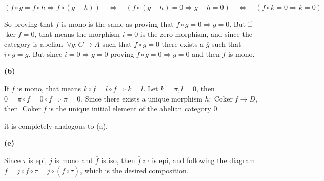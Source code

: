 \documentclass[leqno]{article}
\DeclareMathOperator{\coker}{Coker}
\begin{document}
\fbox{$\Leftarrow$}
\[
  (f\circ g = f\circ h \Rightarrow f\circ (g-h) ) \quad \iff \quad (f\circ (g-h)=0 \Rightarrow g-h=0 ) \quad \iff \quad (f\circ k =0 \Rightarrow k=0)
\] 

So proving that $f$ is mono is the same as proving that $f\circ g = 0 \Rightarrow g=0$. But if $\ker f = 0$, that means the morphism  $i=0$ is the zero morphism, and since the category is abelian  $\ \forall g:C\to A$ such that $f\circ g=0$ there exists a $\overline{g}$ such that $i\circ \overline{g}=g$. But since $i=0 \Rightarrow g=0$ proving $f\circ g =0 \Rightarrow g=0$ and then $f$ is mono.


\textbf{(b)}

\fbox{$\Rightarrow$} If $f$ is mono, that means  $k\circ f =l\circ f \Rightarrow k=l$. Let $k = \pi, l = 0$, then $0=\pi\circ f=0\circ f\Rightarrow \pi=0$. Since there exists a unique morphism $\overline{h}:\coker f\to D$, then $\coker f$ is the unique initial element of the abelian category $0$.

\fbox{$\Leftarrow$} it is completely analogous to (a).

\textbf{(e)} 

Since $\tau $ is epi, $j$ is mono and  $\overline{f}$ is iso, then $\overline{f}\circ \tau $ is epi, and following the diagram $f = j\circ \overline{f} \circ \tau  = j\circ (\overline{f}\circ \tau)$, which is the desired composition.
\end{document}
